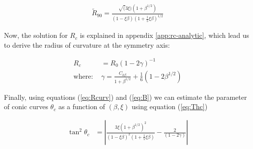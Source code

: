\begin{align}
\tilde{R}_{90} = \frac{\sqrt(3\xi)\left(1+\beta^{1/2}\right)}{(1-\xi\beta)\left(1+\frac{1}{5}\xi\beta\right)^{1/2}}
\label{eq:B}
\end{align}

Now, the solution for $R_c$ is explained in appendix \ref{app:rc-analytic},
which lead us to derive the radius of curvature at the symmetry axis:

\begin{align}
R_c &= R_0\left(1-2\gamma\right)^{-1} \label{eq:Rcurv} \\
\mathrm{where:~} & \gamma = \frac{C_{k\beta}}{1+\beta^{1/2}}+\frac{1}{6}(1-2\beta^{1/2})
\end{align}

Finally, using equations (\ref{eq:Rcurv}) and (\ref{eq:B}) we can estimate the parameter of
conic curves $\theta_c$ as a function of $(\beta,\xi)$ using equation (\ref{eq:Thc})

\begin{align}
\tan^2\theta_c &= \left| \frac{3\xi\left(1+\beta^{1/2}\right)^2}{\left(1-\xi\beta\right)^2\left(1+\frac{1}{5}\xi\beta\right)}-\frac{2}{\left(1-2\gamma\right)}\right| 
\label{eq:thc-CRW}
\end{align}

